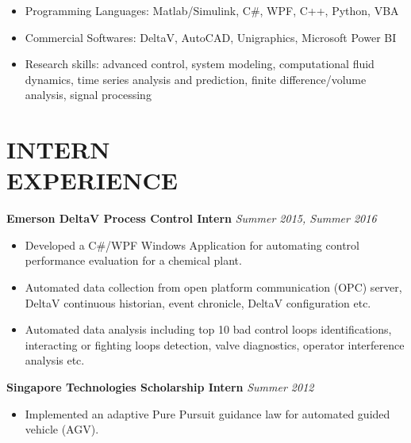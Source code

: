 \documentclass[margin, 9pt]{res} %
\begin{document}
\begin{resume}
\vspace*{-2pt}
\begin{itemize}[leftmargin=*] \itemsep -4pt
	\item Programming Languages: Matlab/Simulink, C\#, WPF,  C++, Python, VBA
	\item Commercial Softwares: DeltaV, AutoCAD, Unigraphics, Microsoft Power BI
	\item Research skills: advanced control, system modeling, computational fluid dynamics, time series analysis and prediction, finite difference/volume analysis, signal processing
\end{itemize}


\section{INTERN\\ EXPERIENCE}

{\textbf{Emerson DeltaV Process Control Intern}} \hfill\textit{Summer 2015, Summer 2016}\\
\vspace*{-10pt}
\begin{itemize}[leftmargin=*] \itemsep -3pt
\vspace*{-5pt}
	\item Developed a C\#/WPF Windows Application for automating control performance evaluation for a chemical plant.
    \item Automated data collection from open platform communication (OPC) server, DeltaV continuous historian, event chronicle, DeltaV configuration etc.
	\item Automated data analysis including  top 10 bad control loops identifications, interacting or fighting  loops detection, valve diagnostics, operator interference analysis etc.
\end{itemize}

\medskip
{\textbf{Singapore Technologies Scholarship Intern}} \hfill\textit{Summer 2012}\\
\vspace*{-10pt}
\begin{itemize}[leftmargin=*] \itemsep -3pt
\vspace*{-5pt}
	\item Implemented an adaptive Pure Pursuit guidance law for automated guided vehicle (AGV).
\end{itemize}


\end{resume}
\end{document}
